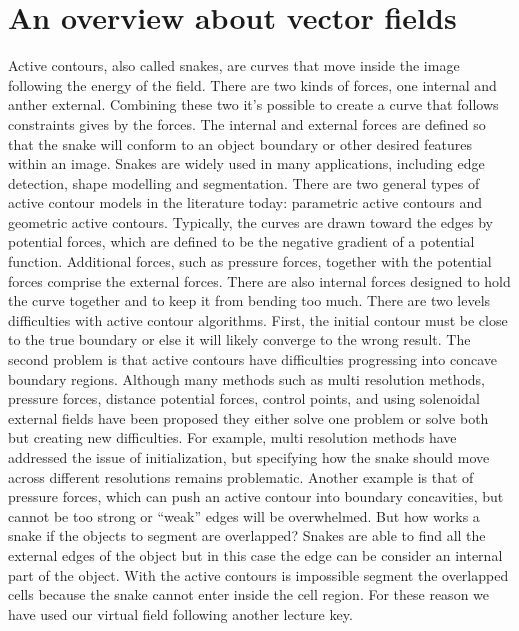 
\chapter{An overview about vector fields}

Active contours, also called snakes, are curves that move inside the image following the energy of the field. There are two kinds of forces, one internal and anther external. Combining these two it's possible to create a curve that follows constraints gives by the forces. The  internal  and  external  forces  are  defined  so  that  the  snake  will conform to an object boundary or other desired features within an image. Snakes are widely used  in  many  applications,  including  edge  detection,  shape  modelling and segmentation. There  are  two  general  types  of  active  contour  models  in  the literature  today:  parametric active contours and geometric active contours. Typically,  the  curves  are  drawn  toward  the edges  by  potential  forces,  which  are  defined  to  be  the  negative  gradient  of  a  potential function.  Additional  forces,  such  as  pressure  forces,  together  with  the  potential  forces comprise the external forces. There are also internal forces designed to hold the curve together and to keep it from bending too  much.  There  are  two  levels  difficulties  with  active  contour  algorithms.  First,  the  initial contour must be close to the true boundary or else it will likely converge to the wrong result. The second problem is that active contours have difficulties progressing into concave  boundary  regions.  Although  many  methods  such  as  multi resolution  methods, pressure forces, distance potential forces, control points, and using solenoidal external fields have been proposed they either solve one problem or solve both but creating new difficulties. For  example,  multi resolution  methods  have  addressed  the  issue  of  initialization,  but specifying  how  the  snake  should  move  across  different  resolutions  remains  problematic. Another example is that of pressure forces, which can push an active contour into boundary concavities, but cannot be too strong or “weak” edges will be overwhelmed. But how works a snake if the objects to segment are overlapped? Snakes are able to find all the external edges of the object but in this case the edge can be consider an internal part of the object. With the active contours is impossible segment the overlapped cells because the snake cannot enter inside the cell region. For these reason we have used our virtual field following another lecture key.
